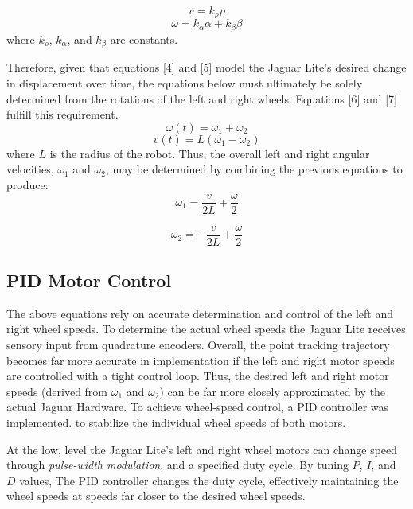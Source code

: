 \documentclass[conference]{IEEEtran}
\begin{document}
\begin{equation}
v = k_{\rho} \rho
\end{equation}
\begin{equation}
\omega = k_{\alpha} \alpha  +  k_{\beta} \beta 
\end{equation}
where $k_{\rho}$, $k_{\alpha}$, and $k_{\beta}$ are constants.

Therefore, given that equations [4] and [5] model the Jaguar Lite's desired
 change in displacement over time, the equations below must ultimately be solely determined from
the rotations of the left and right wheels.  Equations [6] and [7] fulfill 
this requirement.
\begin{equation}
\omega(t) = \omega_1 + \omega_2 
\end{equation} 
\begin{equation}
v(t) = L \left( \omega_1 - \omega_2 \right)
\end{equation}
where $L$ is the radius of the robot.
Thus, the overall left and right angular velocities, $\omega_1$ and $\omega_2$, may 
be determined by combining the previous equations to produce:
\begin{equation}
\omega_1 = \frac{v}{2L} + \frac{\omega}{2}
\end{equation}

\begin{equation}
\omega_2 = -\frac{v}{2L} + \frac{\omega}{2} 
\end{equation}

\subsection{PID Motor Control}
The above equations rely on accurate determination and control of the left and right
wheel speeds.  To determine the actual wheel speeds the Jaguar Lite receives 
sensory input from quadrature encoders. 
Overall, the point tracking trajectory becomes far more accurate in implementation
if the left and right motor speeds are controlled with a tight control loop.
Thus, the desired left and right motor speeds (derived from $\omega_1$ and $\omega_2$)
can be far more closely approximated by the actual Jaguar Hardware.
To achieve wheel-speed control, a PID controller was implemented.
to stabilize the individual wheel speeds of both motors.

At the low, level the Jaguar Lite's left and right wheel motors can 
change speed through \emph{pulse-width modulation}, and a specified 
duty cycle.  By tuning $P$, $I$, and $D$ values, The PID controller changes the 
duty cycle, effectively maintaining the 
wheel speeds at speeds far closer to the desired wheel speeds.
\end{document}
